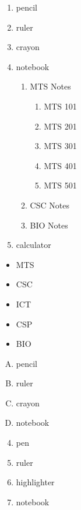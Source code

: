 \documentclass[11pt]{article}
\begin{document}
\begin{enumerate}
\item pencil
\item ruler
\item crayon
\item notebook
	\begin{enumerate}
	\item MTS Notes
		\begin{enumerate}
		\item MTS 101
		\item MTS 201
		\item MTS 301
		\item MTS 401
		\item MTS 501
		\end{enumerate}
	\item CSC Notes
	\item BIO Notes
	\end{enumerate}
\item calculator\\

\end{enumerate}

\vspace{1cm}




\begin{itemize}

\item MTS
\item CSC
\item ICT
\item CSP
\item BIO

\end{itemize}


\vspace{1cm}



\begin{enumerate}[A.]

\item pencil
\item ruler
\item crayon
\item notebook

\end{enumerate}

\pagebreak

\begin{enumerate} \setcounter{enumi}{3}

\item pen
\item ruler
\item highlighter
\item notebook

\end{enumerate}
\end{document}
